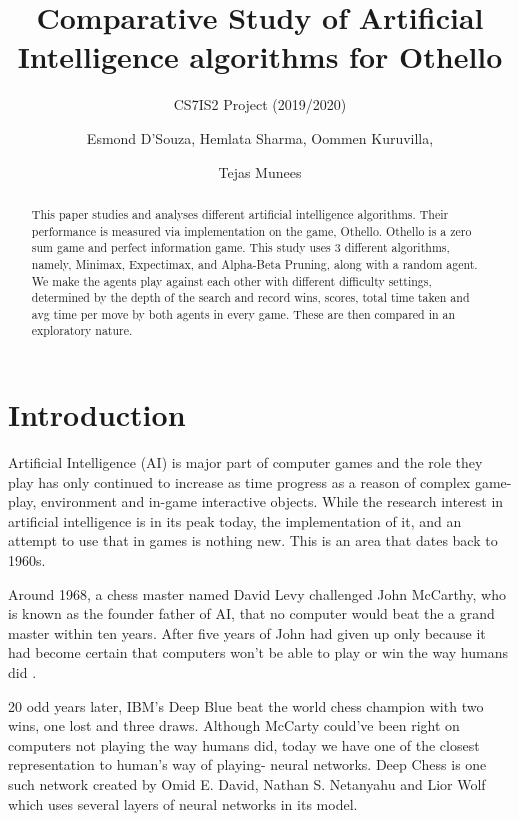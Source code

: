 \documentclass{svproc}
\begin{document}
\mainmatter
\title{Comparative Study of Artificial Intelligence algorithms for Othello
}
\subtitle{CS7IS2 Project (2019/2020)}
\author{Esmond D'Souza, Hemlata Sharma, Oommen Kuruvilla, \and Tejas Munees}


\maketitle              %

\begin{abstract}
This paper studies and analyses different artificial intelligence algorithms. Their performance is measured via implementation on the game, Othello. Othello is a zero sum game and perfect information game. This study uses 3 different algorithms, namely, Minimax, Expectimax, and Alpha-Beta Pruning, along with a random agent. We make the agents play against each other with different difficulty settings, determined by the depth of the search and record wins, scores, total time taken and avg time per move by both agents in every game. These are then compared in an exploratory nature.

\end{abstract}
%

\section{Introduction}

Artificial Intelligence (AI) is major part of computer games and the role they play has only continued to increase as time progress as a reason of complex game-play, environment and in-game interactive objects. While the research interest in artificial intelligence is in its peak today, the implementation of it, and an attempt to use that in games is nothing new. This is an area that dates back to 1960s.

Around 1968, a chess master named David Levy challenged John McCarthy, who is known as the founder father of AI, that no computer would beat the a grand master within ten years. After five years of John had given up only because it had become certain that computers won't be able to play or win the way humans did \cite{MIT_lecture}.

20 odd years later, IBM's Deep Blue beat the world chess champion with two wins, one lost and three draws. Although McCarty could've been right on computers not playing the way humans did, today we have one of the closest representation to human's way of playing- neural networks. Deep Chess is one such network created by Omid E. David, Nathan S. Netanyahu and Lior Wolf \cite{deepchess} which uses several layers of neural networks in its model.
\end{document}
